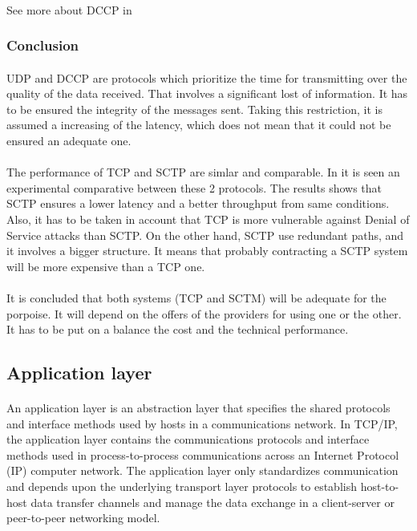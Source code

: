 \paragraph{}
See more about DCCP in \cite{DCCP}


\subsubsection{Conclusion}
\paragraph{}
UDP and DCCP are protocols which prioritize the time for transmitting over the quality of the data received. That involves a significant lost of information. It has to be ensured the integrity of the messages sent. Taking this restriction, it is assumed a increasing of the latency, which does not mean that it could not be ensured an adequate one.
\paragraph{}
The performance of TCP and SCTP are simlar and comparable. In \cite{SCTP_TCP} it is seen an experimental comparative between these 2 protocols. The results shows that SCTP ensures a lower latency and a better throughput from same conditions. Also, it has to be taken in account that TCP is more vulnerable against Denial of Service attacks than SCTP. On the other hand, SCTP use redundant paths, and it involves a bigger structure. It means that probably contracting a SCTP system will be more expensive than a TCP one. 
\paragraph{}
It is concluded that both systems (TCP and SCTM) will be adequate for the porpoise. It will depend on the offers of the providers for using one or the other. It has to be put on a balance the cost and the technical performance.

\subsection{Application layer}
\paragraph{}
An application layer is an abstraction layer that specifies the shared protocols and interface methods used by hosts in a communications network. In TCP/IP, the application layer contains the communications protocols and interface methods used in process-to-process communications across an Internet Protocol (IP) computer network. The application layer only standardizes communication and depends upon the underlying transport layer protocols to establish host-to-host data transfer channels and manage the data exchange in a client-server or peer-to-peer networking model. 
